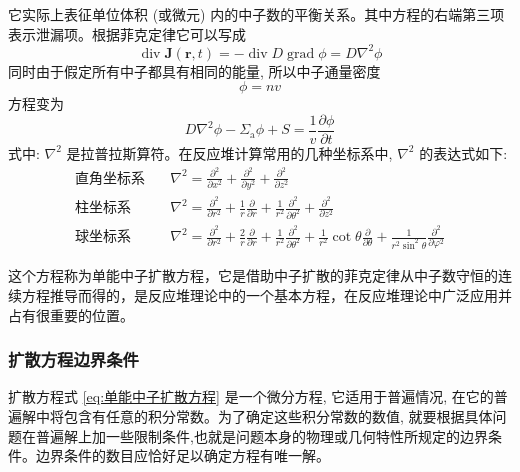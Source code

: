 \documentclass{Sichuan Normal University}
\begin{document}
它实际上表征单位体积 (或微元) 内的中子数的平衡关系。其中方程的右端第三项表示泄漏项。根据菲克定律它可以写成
\begin{equation}
    \operatorname{div} \boldsymbol{J}(\boldsymbol{r}, t)=-\operatorname{div} D \operatorname{grad} \phi=D \nabla^2 \phi
    \label{eq:中子数守恒4}
\end{equation}
同时由于假定所有中子都具有相同的能量, 所以中子通量密度
\begin{equation}
\phi=n v
\end{equation}
方程变为
\begin{equation}
    D \nabla^2 \phi-\Sigma_{\mathrm{a}} \phi+S=\frac{1}{v} \frac{\partial \phi}{\partial t}
    \label{eq:单能中子扩散方程}
\end{equation}
式中: $\nabla^2$ 是拉普拉斯算符。在反应堆计算常用的几种坐标系中, $\nabla^2$ 的表达式如下:
\begin{align}
    \text{直角坐标系} & \quad \nabla^2 = \frac{\partial^2}{\partial x^2} + \frac{\partial^2}{\partial y^2} + \frac{\partial^2}{\partial z^2} \\
    \text{柱坐标系} & \quad \nabla^2 = \frac{\partial^2}{\partial r^2} + \frac{1}{r} \frac{\partial}{\partial r} + \frac{1}{r^2} \frac{\partial^2}{\partial \theta^2} + \frac{\partial^2}{\partial z^2} \\
    \text{球坐标系} & \quad \nabla^2 = \frac{\partial^2}{\partial r^2} + \frac{2}{r} \frac{\partial}{\partial r} + \frac{1}{r^2} \frac{\partial^2}{\partial \theta^2} + \frac{1}{r^2} \cot \theta \frac{\partial}{\partial \theta} + \frac{1}{r^2 \sin^2 \theta} \frac{\partial^2}{\partial \varphi^2}
    \end{align}
    
这个方程称为单能中子扩散方程，它是借助中子扩散的菲克定律从中子数守恒的连续方程推导而得的，是反应堆理论中的一个基本方程，在反应堆理论中广泛应用并占有很重要的位置。
\subsubsection*{扩散方程边界条件}
扩散方程式 \eqref{eq:单能中子扩散方程} 是一个微分方程, 它适用于普遍情况, 在它的普遍解中将包含有任意的积分常数。为了确定这些积分常数的数值, 就要根据具体问题在普遍解上加一些限制条件,也就是问题本身的物理或几何特性所规定的边界条件。边界条件的数目应恰好足以确定方程有唯一解。
\end{document}
